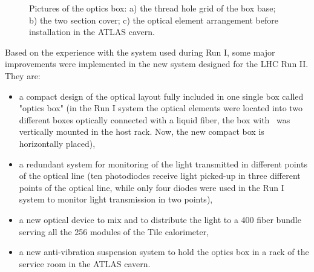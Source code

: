 \begin{figure}[htbp]
\begin{center}
\caption{Pictures of the optics box: a) the thread hole grid of the box base; b) the
two section cover; c) the optical element arrangement before installation in the
ATLAS cavern.  
}\label{fig:x.0}
\end{center}
\end{figure}
%
Based on the experience with the system used during Run I, some major improvements
were implemented in the new system designed for the LHC Run II. They are:
\begin{itemize}
\item a compact design of the optical layout fully included in one single box called
"optics box" (in the Run I system the optical elements were located
into two different boxes optically connected with a liquid fiber, the box with \laser~was vertically mounted in the host rack. Now, the new compact box is horizontally
placed),
\item a redundant system for monitoring of the light transmitted in different points of
the optical line (ten photodiodes receive light picked-up in three
different points of the optical line, while only four diodes were used in the Run I
system to monitor light transmission in two points),
\item a new optical device to mix and to distribute the light to a 400 fiber bundle
serving all the 256 modules of the Tile calorimeter,
\item a new anti-vibration suspension system to hold the optics box in a rack of the
service room in the ATLAS cavern.   
\end{itemize}

